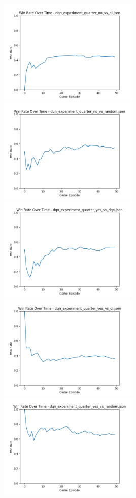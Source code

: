 \includegraphics[width=0.5\textwidth]{images/win_rate_dqn_experiment_quarter_no_vs_ql.png} 
\includegraphics[width=0.5\textwidth]{images/win_rate_dqn_experiment_quarter_no_vs_random.png} 
\includegraphics[width=0.5\textwidth]{images/win_rate_dqn_experiment_quarter_yes_vs_dqn.png} 
\includegraphics[width=0.5\textwidth]{images/win_rate_dqn_experiment_quarter_yes_vs_ql.png} 
\includegraphics[width=0.5\textwidth]{images/win_rate_dqn_experiment_quarter_yes_vs_random.png} 
